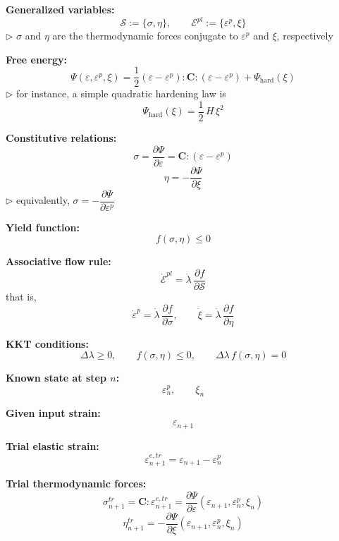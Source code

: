 \documentclass[11pt,a4paper]{article}
\begin{document}
\begin{algorithmic}[1]

\State \textbf{Generalized variables:}
\[
\mathcal S := \{\sigma,\eta\},
\qquad
\mathcal E^{pl} := \{\varepsilon^p,\xi\}
\]
\Statex \hspace{\algorithmicindent}
$\triangleright$ $\sigma$ and $\eta$ are the thermodynamic forces conjugate to
$\varepsilon^p$ and $\xi$, respectively

\State \textbf{Free energy:}
\[
\Psi(\varepsilon,\varepsilon^p,\xi)
=
\frac12 (\varepsilon-\varepsilon^p):\mathbf C:(\varepsilon-\varepsilon^p)
+
\Psi_{\mathrm{hard}}(\xi)
\]
\Statex \hspace{\algorithmicindent}
$\triangleright$ for instance, a simple quadratic hardening law is
\[
\Psi_{\mathrm{hard}}(\xi)=\frac12\,H\,\xi^2
\]

\State \textbf{Constitutive relations:}
\[
\sigma
=
\frac{\partial \Psi}{\partial \varepsilon}
=
\mathbf C:(\varepsilon-\varepsilon^p)
\]
\[
\eta
=
-
\frac{\partial \Psi}{\partial \xi}
\]
\Statex \hspace{\algorithmicindent}
$\triangleright$ equivalently, $\sigma = -\dfrac{\partial \Psi}{\partial \varepsilon^p}$

\State \textbf{Yield function:}
\[
f(\sigma,\eta)\le 0
\]

\State \textbf{Associative flow rule:}
\[
\dot{\mathcal E}^{pl}
=
\dot\lambda\,
\frac{\partial f}{\partial \mathcal S}
\]
that is,
\[
\dot{\varepsilon}^p = \dot\lambda\,\frac{\partial f}{\partial \sigma},
\qquad
\dot{\xi} = \dot\lambda\,\frac{\partial f}{\partial \eta}
\]

\State \textbf{KKT conditions:}
\[
\Delta\lambda \ge 0,
\qquad
f(\sigma,\eta)\le 0,
\qquad
\Delta\lambda\,f(\sigma,\eta)=0
\]

\State \textbf{Known state at step $n$:}
\[
\varepsilon_n^p,\qquad \xi_n
\]


    \State \textbf{Given input strain:}
    \[
    \varepsilon_{n+1}
    \]

    \State \textbf{Trial elastic strain:}
    \[
    \varepsilon_{n+1}^{e,tr}
    =
    \varepsilon_{n+1}-\varepsilon_n^p
    \]

    \State \textbf{Trial thermodynamic forces:}
    \[
    \sigma_{n+1}^{tr}
    =
    \mathbf C:\varepsilon_{n+1}^{e,tr}
    =
    \frac{\partial\Psi}{\partial\varepsilon}
    (\varepsilon_{n+1},\varepsilon_n^p,\xi_n)
    \]
    \[
    \eta_{n+1}^{tr}
    =
    -
    \frac{\partial\Psi}{\partial\xi}
    (\varepsilon_{n+1},\varepsilon_n^p,\xi_n)
    \]


\end{algorithmic}
\end{document}
